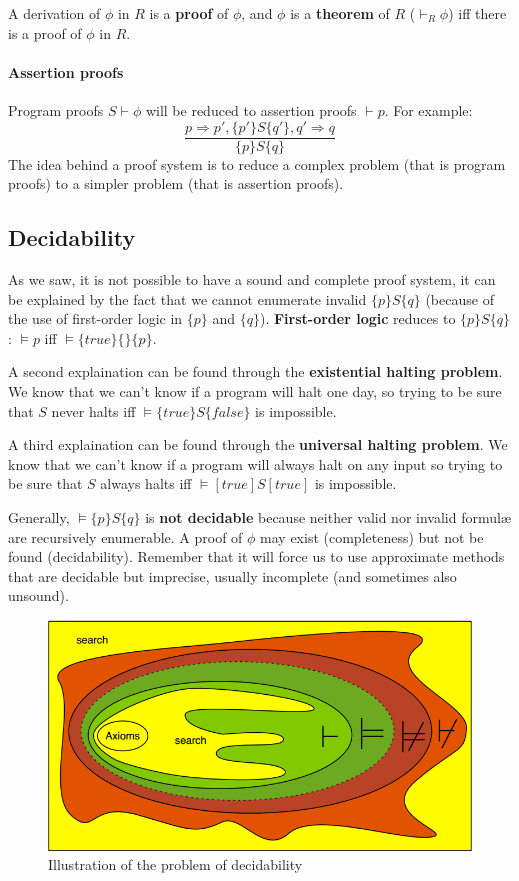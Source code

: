 \documentclass[12pt, a4paper]{book}
\begin{document}
A derivation of $\phi$ in $R$ is a \textbf{proof} of $\phi$, and $\phi$ is a
\textbf{theorem} of $R$ (${\vdash}_{R}\phi$) iff there is a proof of $\phi$
in $R$.

\paragraph{Assertion proofs} Program proofs $S\vdash \phi$ will be reduced to
assertion proofs $\vdash p$. For example:
$$
\frac
{p\Rightarrow p', \{p'\}S\{q'\}, q'\Rightarrow q}
{\{p\}S\{q\}}
$$
The idea behind a proof system is to reduce a complex problem (that is program
proofs) to a simpler problem (that is assertion proofs).

\subsection{Decidability}
\label{sub:Decidability}

As we saw, it is not possible to have a sound and complete proof system, it can
be explained by the fact that we cannot enumerate invalid $\{p\}S\{q\}$ (because
of the use of first-order logic in $\{p\}$ and $\{q\}$). \textbf{First-order
logic} reduces to $\{p\}S\{q\}$: $\vDash p$ iff $\vDash \{true\} \{ \} \{p\}$.
\newline

A second explaination can be found through the \textbf{existential halting
problem}. We know that we can't know if a program will halt one day, so
trying to be sure that $S$ never halts iff $\vDash \{ true\} S \{ false\}$ is
impossible. \newline

A third explaination can be found through the \textbf{universal halting
problem}. We know that we can't know if a program will always halt on any input
so trying to be sure that $S$ always halts iff $\vDash [true] S [true]$ is
impossible. \newline

Generally, $\vDash \{ p \} S \{ q \}$ is \textbf{not decidable} because
neither valid nor invalid formul\ae{} are recursively enumerable. A proof of
$\phi$ may exist (completeness) but not be found (decidability). Remember that
it will force us to use approximate methods that are decidable but imprecise,
usually incomplete (and sometimes also unsound).

\begin{figure}[!ht]
    \centering
    \includegraphics[width=0.65\linewidth]{decidability.png}
    \caption{Illustration of the problem of decidability}
\end{figure}
\end{document}
